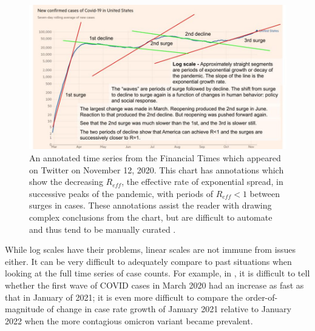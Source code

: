 \documentclass[article]{jdssv}\usepackage[]{graphicx}\usepackage[]{color}
\begin{document}
\begin{figure}
\centering
\includegraphics[width=.8\linewidth]{ft-reference-lines}
\caption{An annotated time series from the Financial Times which appeared on Twitter on November 12, 2020. This chart has annotations which show the decreasing $R_{eff}$, the effective rate of exponential spread, in successive peaks of the pandemic, with periods of $R_{eff}<1$ between surges in cases. These annotations assist the reader with drawing complex conclusions from the chart, but are difficult to automate and thus tend to be manually curated \citep{gubrudDrEricDingWeVe2020}.}
\label{fig:log-scale-ref-multiple}
\end{figure}


While log scales have their problems, linear scales are not immune from issues either. It can be very difficult to adequately compare to past situations when looking at the full time series of case counts. For example, in , it is difficult to tell whether the first wave of COVID cases in March 2020 had an increase as fast as that in January of 2021; it is even more difficult to compare the order-of-magnitude of change in case rate growth of January 2021 relative to January 2022 when the more contagious omicron variant became prevalent. 
\end{document}

